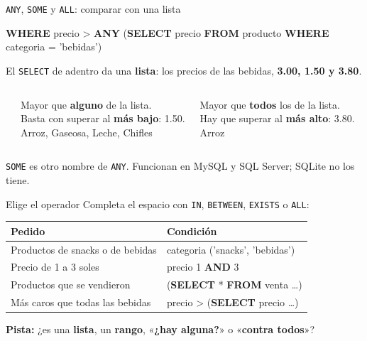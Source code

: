 \documentclass[aspectratio=169,10pt,c]{beamer}
\newcommand{\bl}[1][1.9cm]{\underline{\hspace{#1}}}
\newcommand{\kw}[1]{\textcolor{utpRojo}{\textbf{#1}}}
\newcommand{\nuevo}[1]{{%
  \setlength{\fboxsep}{1.2pt}%
  \begingroup
  \renewcommand{\kw}[1]{\textcolor{utpNegro}{\textbf{##1}}}%
  \colorbox{yellow!45}{\textcolor{utpNegro}{#1}}%
  \endgroup}}
\newcommand{\ins}[1]{\tikz[baseline=-0.5ex]{\node[rounded corners=2pt,fill=utpRojo,text=white,
  font=\bfseries\scriptsize,inner xsep=5pt,inner ysep=2.5pt] {#1};}}
\newcommand{\etiqueta}[1]{\tikz[baseline=-0.5ex]{\node[rounded corners=2pt,fill=utpNegro,text=white,
  font=\bfseries\scriptsize,inner xsep=6pt,inner ysep=3pt] {#1};}}
\newenvironment{sqlcode}[1][.86\textwidth]
  {\begin{center}\begin{lrbox}{\sqlbuf}\begin{minipage}{#1}\ttfamily\footnotesize\vspace{6pt}\raggedright}
  {\vspace{6pt}\end{minipage}\end{lrbox}\colorbox{utpGrisClaro}{\usebox{\sqlbuf}}\end{center}}
\begin{document}
\begin{frame}{\texttt{ANY}, \texttt{SOME} y \texttt{ALL}: comparar con una lista}
\begin{sqlcode}[.92\textwidth]
\scriptsize
\kw{WHERE} precio > \nuevo{\kw{ANY}} (\kw{SELECT} precio \kw{FROM} producto \kw{WHERE} categoria = 'bebidas')
\end{sqlcode}
\vspace{-0.1cm}
\small El \texttt{SELECT} de adentro da una \textbf{lista}: los precios de las bebidas, \textbf{3.00, 1.50 y 3.80}.
\vspace{0.4cm}
\begin{columns}[T,onlytextwidth]
\centering\etiqueta{> ANY \ (o \ > SOME)}\\[6pt]
\raggedright\small Mayor que \textbf{alguno} de la lista.\\
Basta con superar al \textbf{más bajo}: 1.50.\\[6pt]
\centering\scriptsize\ttfamily Arroz, Gaseosa, Leche, Chifles
\centering\etiqueta{> ALL}\\[6pt]
\raggedright\small Mayor que \textbf{todos} los de la lista.\\
Hay que superar al \textbf{más alto}: 3.80.\\[6pt]
\centering\scriptsize\ttfamily Arroz
\end{columns}
\vspace{0.5cm}
\vspace{0.05cm}
\footnotesize\color{utpGris} \texttt{SOME} es otro nombre de \texttt{ANY}. Funcionan en MySQL y SQL Server; SQLite no los tiene.
\end{frame}
\begin{frame}{\ins{Práctica 2} Elige el operador}
\small Completa el espacio con \texttt{IN}, \texttt{BETWEEN}, \texttt{EXISTS} o \texttt{ALL}:
\vspace{0.4cm}
\begin{center}
\small
\begin{tabular}{>{\raggedright\arraybackslash}p{4.4cm}>{\ttfamily\footnotesize}l}
\toprule
\bfseries Pedido & \normalfont\bfseries Condición \\
\midrule
Productos de snacks o de bebidas & categoria \bl[1.8cm] ('snacks', 'bebidas') \\[12pt]
Precio de 1 a 3 soles & precio \bl[1.8cm] 1 \kw{AND} 3 \\[12pt]
Productos que se vendieron & \bl[1.8cm] (\kw{SELECT} * \kw{FROM} venta \ldots) \\[12pt]
Más caros que todas las bebidas & precio > \bl[1.8cm] (\kw{SELECT} precio \ldots) \\
\bottomrule
\end{tabular}
\end{center}
\vspace{0.4cm}
\small \textbf{Pista:} ¿es una \textbf{lista}, un \textbf{rango}, «\textbf{¿hay alguna?}» o «\textbf{contra todos}»?
\end{frame}
\end{document}
